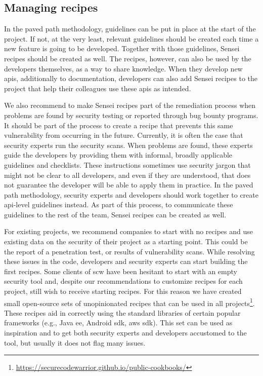 \subsection{Managing recipes}
\label{sec:manager}
In the paved path methodology, guidelines can be put in place at the start of the project.
If not, at the very least, relevant guidelines should be created each time a new feature is going to be developed.
Together with those guidelines, Sensei recipes should be created as well.
The recipes, however, can also be used by the developers themselves, as a way to share knowledge.
When they develop new \glspl{api}, additionally to documentation, developers can also add Sensei recipes to the project that help their colleagues use these \glspl{api} as intended.

We also recommend to make Sensei recipes part of the remediation process when problems are found by security testing or reported through bug bounty programs.
It should be part of the process to create a recipe that prevents this same vulnerability from occurring in the future.
Currently, it is often the case that security experts run the security scans.
When problems are found, these experts guide the developers by providing them with informal, broadly applicable guidelines and checklists.
These instructions sometimes use security jargon that might not be clear to all developers, and even if they are understood, that does not guarantee the developer will be able to apply them in practice.
In the paved path methodology, security experts and developers should work together to create \gls{api}-level guidelines instead.
As part of this process, to communicate these guidelines to the rest of the team, Sensei recipes can be created as well.

For existing projects, we recommend companies to start with no recipes and use existing data on the security of their project as a starting point.
This could be the report of a penetration test, or results of vulnerability scans.
While resolving these issues in the code, developers and security experts can start building the first recipes.
Some clients of \gls{scw} have been hesitant to start with an empty security tool and, despite our recommendations to customize recipes for each project, still wish to receive starting recipes.
For this reason we have created small open-source sets of unopinionated recipes that can be used in all projects\footnote{\url{https://securecodewarrior.github.io/public-cookbooks/}}.
These recipes aid in correctly using the standard libraries of certain popular frameworks (e.g., Java 
\gls{ee}, Android \gls{sdk}, \gls{aws} \gls{sdk}).
This set can be used as inspiration and to get both security experts and developers accustomed to the tool, but usually it does not flag many issues.

